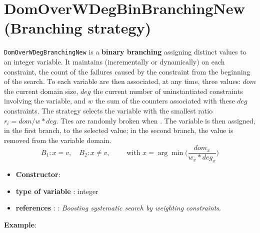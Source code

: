 \section{DomOverWDegBinBranchingNew (Branching strategy)}\label{domoverwdegbin:domoverwdegbinbranchstrat}\hypertarget{domoverwdegbin:domoverwdegbinbranchstrat}{}
\begin{notedef}
  \texttt{DomOverWDegBranchingNew} is a \textbf{binary branching} assigning distinct values to an integer variable. It maintains (incrementally or dynamically) on each constraint, the count of the failures caused by the constraint from the beginning of the search.
To each variable are then associated, at any time, three values: $dom$ the current domain size, $deg$ the current number of uninstantiated constraints involving the variable, and $w$ the sum of the counters associated with these $deg$ constraints.
The strategy selects the variable with the smallest ratio $r_i=dom/w*deg$.  Ties are randomly broken when .
The variable is then assigned, in the first branch, to the selected value; in the second branch, the value is removed from the variable domain.
$$B_1: x=v,\quad B_2: x\neq v,\qquad\text{ with } x=\arg\min\bigl(\frac{dom_x}{w_x*deg_x}\bigr)$$\end{notedef}

\begin{itemize}
	\item \textbf{Constructor}: 
	\item \textbf{type of variable} : integer
	\item \textbf{references} : \cite{Boussemart04}: \emph{Boosting systematic search by weighting constraints}.
\end{itemize}

\textbf{Example}:
%


